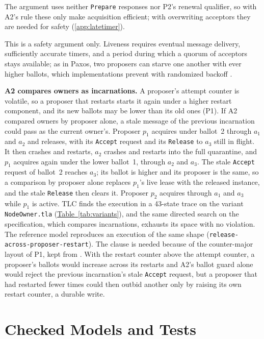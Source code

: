 \documentclass[final,5p,times,twocolumn,number]{elsarticle}
\newcommand{\code}[1]{\texttt{#1}}
\newcommand{\tabref}[1]{\hyperref[#1]{Table~\ref*{#1}}}
\begin{document}
The argument uses neither \code{Prepare} responses nor P2's renewal qualifier, so with A2's rule these only make acquisition efficient; with overwriting acceptors they are needed for safety (\ref{app:latetimer}).

This is a safety argument only.  Liveness requires eventual message delivery, sufficiently accurate timers, and a period during which a quorum of acceptors stays available; as in Paxos, two proposers can starve one another with ever higher ballots, which implementations prevent with randomized backoff \cite{ref1}.

\smallskip
\noindent\textbf{A2 compares owners as incarnations.}  A proposer's attempt counter is volatile, so a proposer that restarts starts it again under a higher restart component, and its new ballots may be lower than its old ones (P1).  If A2 compared owners by proposer alone, a stale message of the previous incarnation could pass as the current owner's.  Proposer $p_1$ acquires under ballot~2 through $a_1$ and $a_2$ and releases, with its \code{Accept} request and its \code{Release} to $a_3$ still in flight.  It then crashes and restarts, $a_2$ crashes and restarts into the full quarantine, and $p_1$ acquires again under the lower ballot~1, through $a_2$ and $a_3$.  The stale \code{Accept} request of ballot~2 reaches $a_3$; its ballot is higher and its proposer is the same, so a comparison by proposer alone replaces $p_1$'s live lease with the released instance, and the stale \code{Release} then clears it.  Proposer $p_2$ acquires through $a_1$ and $a_3$ while $p_1$ is active.  TLC finds the execution in a 43-state trace on the variant \code{NodeOwner.tla} (\tabref{tab:variants}), and the same directed search on the specification, which compares incarnations, exhausts its space with no violation.  The reference model reproduces an execution of the same shape (\code{release-across-proposer-restart}).  The clause is needed because of the counter-major layout of P1, kept from \cite{ref1}.  With the restart counter above the attempt counter, a proposer's ballots would increase across its restarts and A2's ballot guard alone would reject the previous incarnation's stale \code{Accept} request, but a proposer that had restarted fewer times could then outbid another only by raising its own restart counter, a durable write.

\section{Checked Models and Tests}\label{sec:checked}
\end{document}
